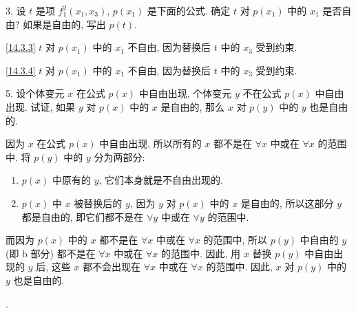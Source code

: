 \documentclass[boxes]{homework}
\begin{document}
\begin{problem}
    3. 设 $t$ 是项 $f_1^2(x_1, x_3)$, $p(x_1)$ 是下面的公式. 确定 $t$ 对 $p(x_1)$ 中的 $x_1$ 是否自由? 如果是自由的, 写出 $p(t)$.
\end{problem}
\begin{solution}
    \ref{14.3.3} $t$ 对 $p(x_1)$ 中的 $x_1$ 不自由, 因为替换后 $t$ 中的 $x_3$ 受到约束.

    \ref{14.3.4} $t$ 对 $p(x_1)$ 中的 $x_1$ 不自由, 因为替换后 $t$ 中的 $x_3$ 受到约束.
\end{solution}
\begin{problem}
    5. 设个体变元 $x$ 在公式 $p(x)$ 中自由出现, 个体变元 $y$ 不在公式 $p(x)$ 中自由出现. 试证, 如果 $y$ 对 $p(x)$ 中的 $x$ 是自由的, 那么 $x$ 对 $p(y)$ 中的 $y$ 也是自由的.
\end{problem}
\begin{solution}
    因为 $x$ 在公式 $p(x)$ 中自由出现, 所以所有的 $x$ 都不是在 $\forall x$ 中或在 $\forall x$ 的范围中. 将 $p(y)$ 中的 $y$ 分为两部分:
    \begin{enumerate}[label = (\alph*), parsep = 0pt, itemsep = 0pt, topsep = .25em]
        \item $p(x)$ 中原有的 $y$, 它们本身就是不自由出现的.
        \item $p(x)$ 中 $x$ 被替换后的 $y$, 因为 $y$ 对 $p(x)$ 中的 $x$ 是自由的, 所以这部分 $y$ 都是自由的, 即它们都不是在 $\forall y$ 中或在 $\forall y$ 的范围中.
    \end{enumerate}
    而因为 $p(x)$ 中的 $x$ 都不是在 $\forall x$ 中或在 $\forall x$ 的范围中, 所以 $p(y)$ 中自由的 $y$ (即 b 部分) 都不是在 $\forall x$ 中或在 $\forall x$ 的范围中. 因此, 用 $x$ 替换 $p(y)$ 中自由出现的 $y$ 后, 这些 $x$ 都不会出现在 $\forall x$ 中或在 $\forall x$ 的范围中. 因此, $x$ 对 $p(y)$ 中的 $y$ 也是自由的.
\end{solution}.
\end{document}
